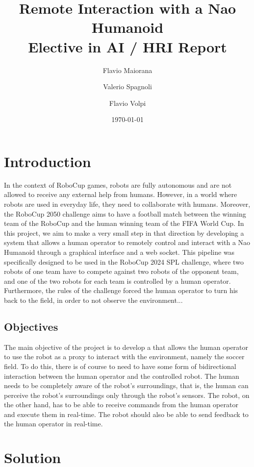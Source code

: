 \documentclass[a4paper, onecolumn, 12pt]{article}
\title{Remote Interaction with a Nao Humanoid \\ Elective in AI / HRI Report}
\author{Flavio Maiorana \and Valerio Spagnoli \and Flavio Volpi}
\date{\today}
\begin{document}
\maketitle

\section{Introduction}
\label{sec:intro}

In the context of RoboCup games, robots are fully autonomous and are not allowed
to receive any external help from humans. However, in a world where robots are
used in everyday life, they need to collaborate with humans.
Moreover, the RoboCup 2050 challenge aims to have a football match between the
winning team of the RoboCup and the human winning team of the FIFA World Cup. In
this project, we aim to make a very small step in that direction by developing a
system that allows a human operator to remotely control and interact with a Nao
Humanoid through a graphical interface and a web socket. This pipeline was
specifically designed to be used in the RoboCup 2024 SPL challenge, where two robots
of one team have to compete against two robots of the opponent team, and one of the
two robots for each team is controlled by a human operator. Furthermore, the rules
of the challenge forced the human operator to turn his back to the field, in order
to not observe the environment...
\subsection{Objectives}
\label{sec:obj}

The main objective of the project is to develop a that allows the human operator
to use the robot as a proxy to interact with the environment, namely the soccer
field. To do this, there is of course to need to have some form of bidirectional
interaction between the human operator and the controlled robot. The human needs
to be completely aware of the robot's surroundings, that is, the human can
perceive the robot's surroundings only through the robot's sensors. The robot,
on the other hand, has to be able to receive commands from the human operator
and execute them in real-time. The robot should also be able to send feedback to
the human operator in real-time. 


\section{Solution}
\label{sec:sol}
\end{document}
